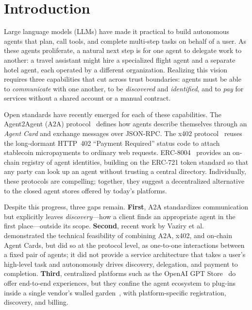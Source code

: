 \documentclass[sigconf]{acmart}
\begin{document}


\maketitle

\section{Introduction}
\label{sec:introduction}

Large language models (LLMs) have made it practical to build
autonomous agents that plan, call tools, and complete multi-step tasks
on behalf of a user. As these agents proliferate, a natural next step
is for one agent to delegate work to another: a travel assistant might
hire a specialized flight agent and a separate hotel agent, each
operated by a different organization. Realizing this vision requires
three capabilities that cut across trust boundaries: agents must be
able to \emph{communicate} with one another, to be \emph{discovered}
and \emph{identified}, and to \emph{pay} for services without a shared
account or a manual contract.

Open standards have recently emerged for each of these capabilities.
The Agent2Agent (A2A) protocol~\cite{a2a2025} defines how agents
describe themselves through an \emph{Agent Card} and exchange messages
over JSON-RPC. The x402 protocol~\cite{x402whitepaper} reuses the long-dormant
HTTP~402 ``Payment Required'' status code to attach stablecoin
micropayments to ordinary web requests. ERC-8004~\cite{erc8004}
provides an on-chain registry of agent identities, building on the
ERC-721 token standard so that any party can look up an
agent without trusting a central directory. Individually, these
protocols are compelling; together, they suggest a decentralized
alternative to the closed agent stores offered by today's platforms.

Despite this progress, three gaps remain. \textbf{First}, A2A
standardizes communication but explicitly leaves \emph{discovery}---how
a client finds an appropriate agent in the first place---outside its
scope. \textbf{Second}, recent work by Vaziry et
al.~\cite{vaziry2025} demonstrated the technical feasibility of
combining A2A, x402, and on-chain Agent Cards, but did so at the
protocol level, as one-to-one interactions between a fixed pair of
agents; it did not provide a service architecture that takes a
user's high-level task and autonomously drives discovery, delegation,
and payment to completion. \textbf{Third}, centralized platforms such
as the OpenAI GPT Store~\cite{gptstore} do offer end-to-end
experiences, but they confine the agent ecosystem to plug-ins inside a
single vendor's walled garden~\cite{frieden2016platforms}, with
platform-specific registration, discovery, and billing.
\end{document}

